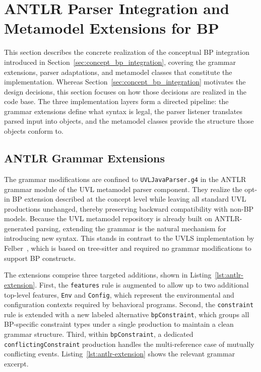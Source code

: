 \section{ANTLR Parser Integration and Metamodel Extensions for BP}
\label{sec:impl_bp_java}

This section describes the concrete realization of the conceptual BP integration introduced in Section~\ref{sec:concept_bp_integration}, covering the grammar extensions, parser adaptations, and metamodel classes that constitute the implementation.
Whereas Section~\ref{sec:concept_bp_integration} motivates the design decisions, this section focuses on how those decisions are realized in the code base.
The three implementation layers form a directed pipeline: the grammar extensions define what syntax is legal, the parser listener translates parsed input into objects, and the metamodel classes provide the structure those objects conform to.

\subsection{ANTLR Grammar Extensions}
\label{subsec:antlr_extensions}

The grammar modifications are confined to \texttt{UVLJavaParser.g4} in the ANTLR grammar module of the UVL metamodel parser component.
They realize the opt-in BP extension described at the concept level while leaving all standard UVL productions unchanged, thereby preserving backward compatibility with non-BP models.
Because the UVL metamodel repository is already built on ANTLR-generated parsing, extending the grammar is the natural mechanism for introducing new syntax.
This stands in contrast to the UVLS implementation by Felber~\cite{felber_comprehensible_2025}, which is based on tree-sitter and required no grammar modifications to support BP constructs.

The extensions comprise three targeted additions, shown in Listing~\ref{lst:antlr-extension}.
First, the \texttt{features} rule is augmented to allow up to two additional top-level features, \texttt{Env} and \texttt{Config}, which represent the environmental and configuration contexts required by behavioral programs.
Second, the \texttt{constraint} rule is extended with a new labeled alternative \texttt{bpConstraint}, which groups all BP-specific constraint types under a single production to maintain a clean grammar structure.
Third, within \texttt{bpConstraint}, a dedicated \texttt{conflictingConstraint} production handles the multi-reference case of mutually conflicting events.
Listing~\ref{lst:antlr-extension} shows the relevant grammar excerpt.

